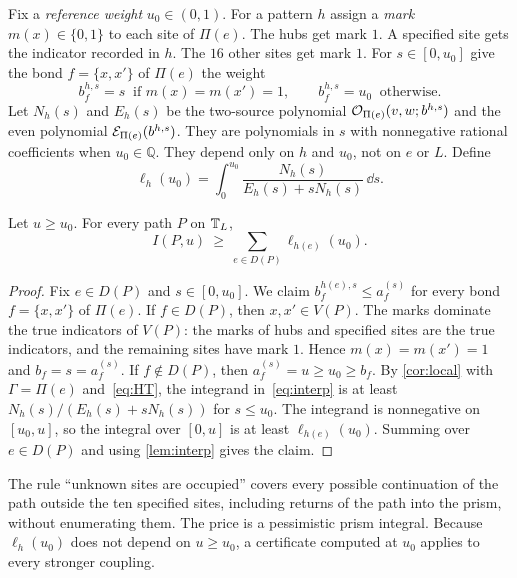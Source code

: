 

Fix a \emph{reference weight} $u_0\in(0,1)$. For a pattern $h$ assign a \emph{mark} $m(x)\in\{0,1\}$ to each site of $\Pi(e)$. The hubs get mark $1$. A specified site gets the indicator recorded in $h$. The $16$ other sites get mark $1$. For $s\in[0,u_0]$ give the bond $f=\{x,x'\}$ of $\Pi(e)$ the weight
\begin{equation}\label{eq:prismweights}
 b^{h,s}_f=s\ \text{ if } m(x)=m(x')=1,\qquad b^{h,s}_f=u_0\ \text{ otherwise}.
\end{equation}
Let $N_h(s)$ and $E_h(s)$ be the two-source polynomial $\mathcal O_{\Pi(e)}(v,w;b^{h,s})$ and the even polynomial $\mathcal E_{\Pi(e)}(b^{h,s})$. They are polynomials in $s$ with nonnegative rational coefficients when $u_0\in\mathbb Q$. They depend only on $h$ and $u_0$, not on $e$ or $L$. Define
\begin{equation}\label{eq:ellh}
 \ell_h(u_0)=\int_0^{u_0}\frac{N_h(s)}{E_h(s)+sN_h(s)}\,\dd s .
\end{equation}

\begin{lemma}\label{lem:prismbound}
Let $u\ge u_0$. For every path $P$ on $\mathbb T_L$,
\[
 I(P,u)\ \ge\ \sum_{e\in D(P)}\ell_{h(e)}(u_0).
\]
\end{lemma}

\begin{proof}
Fix $e\in D(P)$ and $s\in[0,u_0]$. We claim $b^{h(e),s}_f\le a^{(s)}_f$ for every bond $f=\{x,x'\}$ of $\Pi(e)$. If $f\in D(P)$, then $x,x'\in V(P)$. The marks dominate the true indicators of $V(P)$: the marks of hubs and specified sites are the true indicators, and the remaining sites have mark $1$. Hence $m(x)=m(x')=1$ and $b_f=s=a^{(s)}_f$. If $f\notin D(P)$, then $a^{(s)}_f=u\ge u_0\ge b_f$. By \cref{cor:local} with $\Gamma=\Pi(e)$ and~\eqref{eq:HT}, the integrand in~\eqref{eq:interp} is at least $N_h(s)/(E_h(s)+sN_h(s))$ for $s\le u_0$. The integrand is nonnegative on $[u_0,u]$, so the integral over $[0,u]$ is at least $\ell_{h(e)}(u_0)$. Summing over $e\in D(P)$ and using \cref{lem:interp} gives the claim.
\end{proof}

The rule ``unknown sites are occupied'' covers every possible continuation of the path outside the ten specified sites, including returns of the path into the prism, without enumerating them. The price is a pessimistic prism integral. Because $\ell_h(u_0)$ does not depend on $u\ge u_0$, a certificate computed at $u_0$ applies to every stronger coupling.

